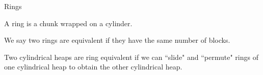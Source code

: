 \documentclass[9pt]{beamer}
\newcommand{\Z}{\mathbb{Z}}
\newcommand\xxaxis{0}
\newcommand\yyaxis{90}
\newcommand\sq[2]{
    \fill[fill=gray!25, draw=black, rounded corners, line width=1pt, shift={(\xxaxis:#1)}, shift={(\yyaxis:#2)}] 
    (0,0) -- (1,0) -- (1,-1) -- (0,-1) -- cycle; }
\begin{document}
\begin{frame}{Rings}
\begin{definition} A \alert{ring} is a chunk wrapped on a cylinder.
\begin{center}  \end{center}
\end{definition}

\begin{definition} We say two rings are \alert{equivalent} if they have the same number of blocks. %
\end{definition}

\begin{definition} Two cylindrical heaps are \alert{ring equivalent} if we can ``slide" and ``permute" rings of one cylindrical heap to obtain the other cylindrical heap.
\end{definition}
\end{frame}
\end{document}
